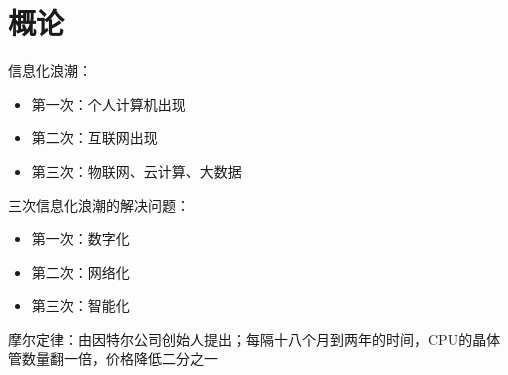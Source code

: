\section{概论}%
\label{sec:概论}
信息化浪潮：
\begin{itemize}
    \item 第一次：个人计算机出现
    \item 第二次：互联网出现
    \item 第三次：物联网、云计算、大数据
\end{itemize}
三次信息化浪潮的解决问题：
\begin{itemize}
    \item 第一次：数字化
    \item 第二次：网络化
    \item 第三次：智能化
\end{itemize}
\begin{notation}
    摩尔定律：由因特尔公司创始人提出；每隔十八个月到两年的时间，CPU的晶体管数量翻一倍，价格降低二分之一
\end{notation}

